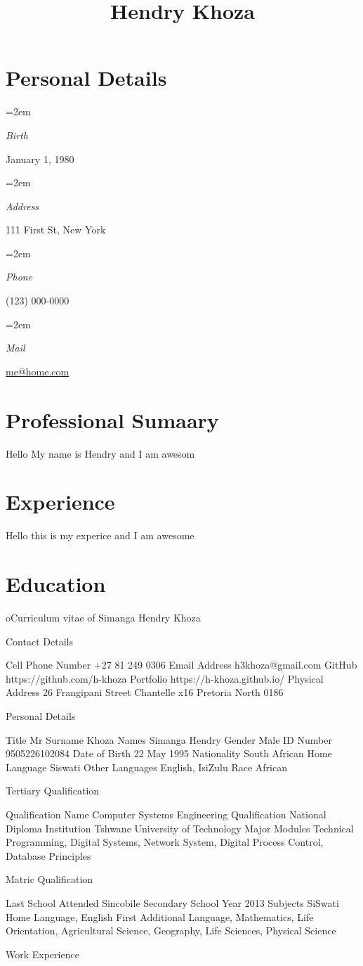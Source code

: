 \documentclass[paper=a4,fontsize=12pt]{article} %
\title{Hendry Khoza}
\newcommand{\PersonalEntry}[2]{
		\noindent\hangindent=2em\hangafter=0 %
		\parbox{\spacebox}{        %
		\textit{#1}}		       %
		\hspace{1.5em} #2 \par}    %
\begin{document}
\section{Personal Details}
\PersonalEntry{Birth}{January 1, 1980}
\PersonalEntry{Address}{111 First St, New York}
\PersonalEntry{Phone}{(123) 000-0000}
\PersonalEntry{Mail}{\url{me@home.com}}


\section{Professional Sumaary}
Hello My name is Hendry and I am awesom

\section{Experience}
Hello this is my experice and I am awesome

\section{Education}
oCurriculum vitae of 
Simanga Hendry Khoza


Contact Details 
	
	Cell Phone Number			+27 81 249 0306
	Email Address				h3khoza@gmail.com
	GitHub					https://github.com/h-khoza
	Portfolio				https://h-khoza.github.io/
Physical Address			26 Frangipani Street 
Chantelle x16
Pretoria North
0186
	
Personal Details

	Title 					Mr
	Surname				Khoza
	Names					Simanga Hendry
	Gender				Male
	ID Number				9505226102084
	Date of Birth				22 May 1995
Nationality				South African 
Home Language			Siswati
	Other Languages			English, IsiZulu
	Race					African

Tertiary Qualification 

Qualification Name			Computer Systems Engineering  
Qualification				National Diploma 
Institution				Tshwane University of Technology
	Major Modules 			Technical Programming, Digital Systems, 
Network System, Digital Process Control, Database Principles 

Matric Qualification 

Last School Attended		Sincobile Secondary School
Year				2013	
Subjects			SiSwati Home Language, English First Additional Language, 
Mathematics, 	Life Orientation, Agricultural Science,
Geography, Life Sciences, Physical Science

Work Experience 
\end{document}
